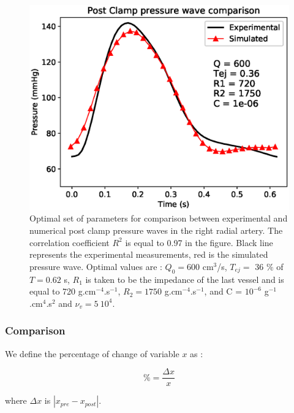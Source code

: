 \documentclass{config}
\begin{document}
\begin{figure}[H]
\centering
\includegraphics[scale=0.7]{Figures/postclamp.eps}
\caption{Optimal set of parameters for comparison between experimental and numerical post clamp pressure waves in the right radial artery. The correlation coefficient $R^2 $ is equal to 0.97 in the figure. Black line represents the experimental measurements, red is the simulated pressure wave. Optimal values are : $Q_0 = 600 $ cm$^3$/s, $T_{ej}= $ 36 $\%$ of $T = 0.62 $ s, $R_1$ is taken to be the impedance of the last vessel and is equal to 720 g.cm$^{-4}$.s$^{-1}$, $R_2 = 1750 $ g.cm$^{-4}$.s$^{-1}$, and C = $10^{-6}$ g$^{-1}$.cm$^{4}$.s$^{2}$ and $\nu_v = 5 ~ 10^4$.}
\label{post_clamp}
\end{figure}

\subsubsection{Comparison }

We define the percentage of change of variable $x$ as : 

\begin{equation}
\% = \frac{\Delta x}{x} 
\end{equation}

where $\Delta x$ is $|x_{pre} - x_{post}|$. 
\end{document}
